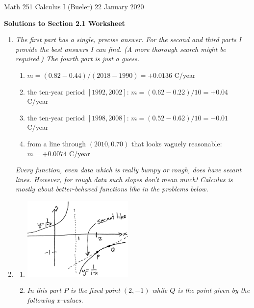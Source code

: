 \documentclass[11pt]{amsart}
\begin{document}
\noindent \scriptsize Math 251 Calculus I (Bueler) \hfill 22 January 2020

\medskip
\Large\centerline{\textbf{Solutions to Section 2.1 Worksheet}}

\normalsize
\thispagestyle{empty}

\medskip
\renewcommand{\labelenumi}{\textbf{\arabic{enumi}.}}
\begin{enumerate}
\item \emph{The first part has a single, precise answer.  For the second and third parts I provide the best answers I can find.  (A more thorough search might be required.)  The fourth part is just a guess.} 

\medskip
    \renewcommand{\labelenumii}{\arabic{enumii}.}
    \begin{enumerate}
    \item $m = (0.82-0.44) / (2018-1990) = + 0.0136$ C/year
    \item the ten-year period $[1992,2002]$: \quad $m=(0.62 - 0.22) / 10 = + 0.04$ C/year
    \item the ten-year period $[1998,2008]$: \quad $m=(0.52 - 0.62) / 10 = - 0.01$ C/year
    \item from a line through $(2010,0.70)$ that looks vaguely reasonable: $m = + 0.0074$ C/year
    \end{enumerate}

\medskip
\noindent \emph{Every function, even data which is really bumpy or rough, \emph{does} have secant lines.  However, for rough data such slopes don't mean much!  Calculus is mostly about better-behaved functions like in the problems below.}

\item 
\medskip
    \renewcommand{\labelenumii}{\alph{enumii})}
    \begin{enumerate}
    \item \includegraphics[align=t,width=0.45\textwidth]{../figs/secantgraph}

\bigskip
    \item \emph{In this part $P$ is the fixed point $(2,-1)$ while $Q$ is the point given by the following $x$-values.}
    

\end{enumerate}
\end{enumerate}
\end{document}
